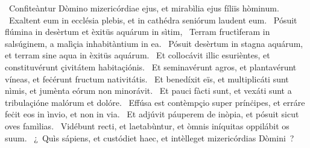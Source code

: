 ~Confiteàntur Dòmino mizericórdiae ejus, et mirabìlia ejus fíliïs hòminum. 
~Exaltent eum in ecclésia plebis, et in cathédra seniórum laudent eum. 
~Pósuit flúmina in desèrtum et èxitüs aquárum in sìtim, 
~Terram fructìferam in salsúginem, a malìçia inhabitàntium in ea. 
~Pósuit desèrtum in stagna aquárum, et terram sine aqua in èxitüs aquárum. 
~Et collocávit illic esurièntes, et constituvérunt çivitátem habitaçiónis. 
~Et seminavérunt agros, et plantavérunt víneas, et feċérunt fructum nativitátis. 
~Et benedíxit eïs, et multiplicáti sunt nìmis, et jumènta eórum non minorávit. 
~Et pauci fàcti sunt, et vexáti sunt a tribulaçióne malórum et dolóre. 
~Effúsa est contèmpçio super prínċipes, et erráre feċit eos in ìnvio, et non in via. 
~Et adjúvit páuperem de inòpia, et pósuit sicut oves famìlias. 
~Vidébunt recti, et laetabùntur, et òmnis iníquitas oppilábit os suum. 
~¿~Quìs sápiens, et custódiet haec, et intèlleget mizericórdias Dòmini~? 
